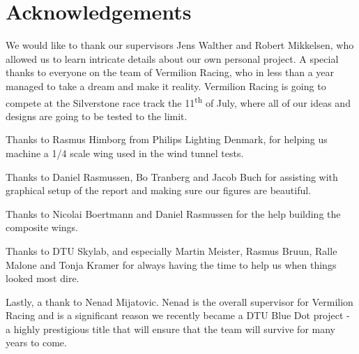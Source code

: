 \chapter*{Acknowledgements}

We would like to thank our supervisors Jens Walther and Robert Mikkelsen, who allowed us to learn intricate details about our own personal project. A special thanks to everyone on the team of Vermilion Racing, who in less than a year managed to take a dream and make it reality. Vermilion Racing is going to compete at the Silverstone race track the 11\textsuperscript{th} of July, where all of our ideas and designs are going to be tested to the limit.

Thanks to Rasmus Himborg from Philips Lighting Denmark, for helping us machine a 1/4 scale wing used in the wind tunnel tests.

Thanks to Daniel Rasmussen, Bo Tranberg and Jacob Buch for assisting with graphical setup of the report and making sure our figures are beautiful.

Thanks to Nicolai Boertmann and Daniel Rasmussen for the help building the composite wings.

Thanks to DTU Skylab, and especially Martin Meister, Rasmus Bruun, Ralle Malone and Tonja Kramer for always having the time to help us when things looked most dire.

Lastly, a thank to Nenad Mijatovic. Nenad is the overall supervisor for Vermilion Racing and is a significant reason we recently became a DTU Blue Dot project - a highly prestigious title that will ensure that the team will survive for many years to come.

\begin{figure}
  \label{fig:sponsorstack}
\end{figure}

